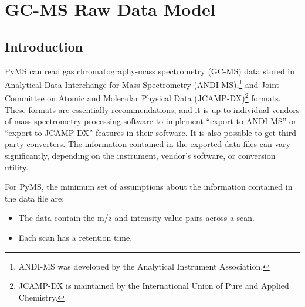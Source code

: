 

\chapter{GC-MS Raw Data Model}

\section{Introduction}

PyMS can read gas chromatography-mass spectrometry (GC-MS) data stored in
Analytical Data Interchange for Mass Spectrometry (ANDI-MS),\footnote{ANDI-MS
was developed by the Analytical Instrument Association.} and Joint Committee on
Atomic and Molecular Physical Data (JCAMP-DX)\footnote{JCAMP-DX is maintained by
the International Union of Pure and Applied Chemistry.} formats. These formats
are essentially recommendations, and it is up to individual vendors of mass
spectrometry processing software to implement ``export to ANDI-MS'' or ``export
to JCAMP-DX'' features in their software. It is also possible to get third party
converters. The information contained in the exported data files
can vary significantly, depending on the instrument, vendor's software, or
conversion utility.

For PyMS, the minimum set of assumptions about the information contained in the
data file are:

\begin{itemize}
 \item The data contain the m/z and intensity value pairs across a scan.
 \item Each scan has a retention time.
\end{itemize}


